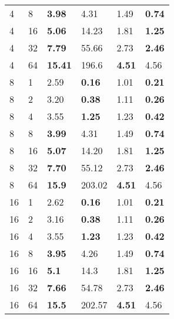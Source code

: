\begin{table}[!ht]
\begin{tabular}{@{}llllll@{}}
		4 & 8 & \textbf{3.98} & 4.31 & 1.49 & \textbf{0.74} \\ 
		4 & 16 & \textbf{5.06} & 14.23 & 1.81 & \textbf{1.25} \\ 
		4 & 32 & \textbf{7.79} & 55.66 & 2.73 & \textbf{2.46} \\ 
		4 & 64 & \textbf{15.41} & 196.6 & \textbf{4.51} & 4.56 \\ \midrule
		8 & 1 & 2.59 & \textbf{0.16} & 1.01 & \textbf{0.21} \\ 
		8 & 2 & 3.20 & \textbf{0.38} & 1.11 & \textbf{0.26} \\ 
		8 & 4 & 3.55 & \textbf{1.25} & 1.23 & \textbf{0.42} \\ 
		8 & 8 & \textbf{3.99} & 4.31 & 1.49 & \textbf{0.74} \\ 
		8 & 16 & \textbf{5.07} & 14.20 & 1.81 & \textbf{1.25} \\ 
		8 & 32 & \textbf{7.70} & 55.12 & 2.73 & \textbf{2.46} \\ 
		8 & 64 & \textbf{15.9} & 203.02 & \textbf{4.51} & 4.56 \\ \midrule
		16 & 1 & 2.62 & \textbf{0.16} & 1.01 & \textbf{0.21} \\ 
		16 & 2 & 3.16 & \textbf{0.38} & 1.11 & \textbf{0.26} \\ 
		16 & 4 & 3.55 & \textbf{1.23} & 1.23 & \textbf{0.42} \\ 
		16 & 8 & \textbf{3.95} & 4.26 & 1.49 & \textbf{0.74} \\ 
		16 & 16 & \textbf{5.1} & 14.3 & 1.81 & \textbf{1.25} \\ 
		16 & 32 & \textbf{7.66} & 54.78 & 2.73 & \textbf{2.46} \\ 
		16 & 64 & \textbf{15.5} & 202.57 & \textbf{4.51} & 4.56 \\ \bottomrule
	\end{tabular}
\end{table}